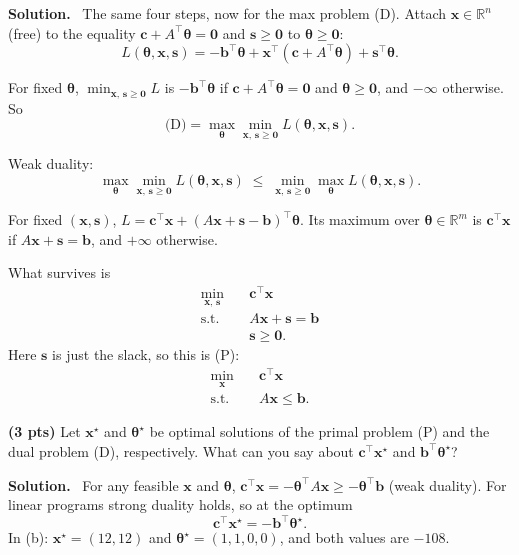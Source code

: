 \documentclass[10pt]{article}
\newenvironment{solution}
  {\par\smallskip\begingroup\color{solink}\textbf{Solution.}\ }
  {\par\endgroup}
\begin{document}
\begin{parts}
\begin{solution}
The same four steps, now for the max problem (D). Attach $\bm{x} \in \mathbb{R}^n$ (free) to the equality
$\bm{c} + A^{\top}\bm{\theta} = \bm{0}$ and $\bm{s} \ge \bm{0}$ to $\bm{\theta} \ge \bm{0}$:
\[
  L(\bm{\theta}, \bm{x}, \bm{s}) = -\bm{b}^{\top}\bm{\theta} + \bm{x}^{\top}(\bm{c} + A^{\top}\bm{\theta}) + \bm{s}^{\top}\bm{\theta}.
\]
\begin{steps}
\item For fixed $\bm{\theta}$, $\min_{\bm{x},\, \bm{s} \ge \bm{0}} L$ is $-\bm{b}^{\top}\bm{\theta}$ if $\bm{c} + A^{\top}\bm{\theta} = \bm{0}$ and
  $\bm{\theta} \ge \bm{0}$, and $-\infty$ otherwise. So
  \[
    \text{(D)} = \max_{\bm{\theta}} \min_{\bm{x},\, \bm{s} \ge \bm{0}} L(\bm{\theta}, \bm{x}, \bm{s}).
  \]
\item Weak duality:
  \[
    \max_{\bm{\theta}} \min_{\bm{x},\, \bm{s} \ge \bm{0}} L(\bm{\theta}, \bm{x}, \bm{s}) \;\le\; \min_{\bm{x},\, \bm{s} \ge \bm{0}} \max_{\bm{\theta}} L(\bm{\theta}, \bm{x}, \bm{s}).
  \]
\item For fixed $(\bm{x}, \bm{s})$, $L = \bm{c}^{\top}\bm{x} + (A\bm{x} + \bm{s} - \bm{b})^{\top}\bm{\theta}$. Its maximum over
  $\bm{\theta} \in \mathbb{R}^m$ is $\bm{c}^{\top}\bm{x}$ if $A\bm{x} + \bm{s} = \bm{b}$, and $+\infty$ otherwise.
\item What survives is
  \[
  \begin{aligned}
    \min_{\bm{x},\, \bm{s}} \quad & \bm{c}^{\top}\bm{x} \\
    \text{s.t.} \quad & A\bm{x} + \bm{s} = \bm{b} \\
                      & \bm{s} \ge \bm{0} .
  \end{aligned}
  \]
  Here $\bm{s}$ is just the slack, so this is (P):
  \[
  \begin{aligned}
    \min_{\bm{x}} \quad & \bm{c}^{\top}\bm{x} \\
    \text{s.t.} \quad & A\bm{x} \le \bm{b} .
  \end{aligned}
  \]
\end{steps}
\end{solution}

\item \textbf{(3 pts)} Let $\bm{x}^{\star}$ and $\bm{\theta}^{\star}$ be optimal solutions of the primal problem (P) and the dual problem (D),
  respectively. What can you say about $\bm{c}^{\top}\bm{x}^{\star}$ and $\bm{b}^{\top}\bm{\theta}^{\star}$?

\begin{solution}
For any feasible $\bm{x}$ and $\bm{\theta}$,
$\bm{c}^{\top}\bm{x} = -\bm{\theta}^{\top}A\bm{x} \ge -\bm{\theta}^{\top}\bm{b}$ (weak duality). For linear programs strong duality
holds, so at the optimum
\[
  \bm{c}^{\top}\bm{x}^{\star} = -\bm{b}^{\top}\bm{\theta}^{\star} .
\]
In (b): $\bm{x}^{\star} = (12, 12)$ and $\bm{\theta}^{\star} = (1, 1, 0, 0)$, and both values are $-108$.
\end{solution}
\end{parts}
\end{document}
